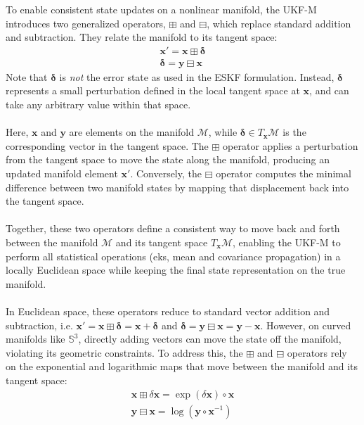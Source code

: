 \noindent
To enable consistent state updates on a nonlinear manifold, the UKF-M introduces two generalized operators, $\boxplus$ and $\boxminus$, which replace standard addition and subtraction. They relate the manifold to its tangent space:
$$
\begin{aligned}
    \mathbf{x}' = \mathbf{x} \boxplus \boldsymbol{\delta} \\
    \boldsymbol{\delta} = \mathbf{y} \boxminus \mathbf{x}
\end{aligned}
$$
Note that $\boldsymbol{\delta}$ is \textit{not} the error state as used in the ESKF formulation. Instead, $\boldsymbol{\delta}$ represents a small perturbation defined in the local tangent space at $\mathbf{x}$, and can take any arbitrary value within that space.  
\\ \\
Here, $\mathbf{x}$ and $\mathbf{y}$ are elements on the manifold $\mathcal{M}$, while $\boldsymbol{\delta} \in T_\mathbf{x}\mathcal{M}$ is the corresponding vector in the tangent space. The $\boxplus$ operator applies a perturbation from the tangent space to move the state along the manifold, producing an updated manifold element $\mathbf{x}'$. Conversely, the $\boxminus$ operator computes the minimal difference between two manifold states by mapping that displacement back into the tangent space.  
\\ \\
Together, these two operators define a consistent way to move back and forth between the manifold $\mathcal{M}$ and its tangent space $T_\mathbf{x}\mathcal{M}$, enabling the UKF-M to perform all statistical operations (eks, mean and covariance propagation) in a locally Euclidean space while keeping the final state representation on the true manifold. 
\\ \\
In Euclidean space, these operators reduce to standard vector addition and subtraction, i.e.
$\mathbf{x}' = \mathbf{x} \boxplus \boldsymbol{\delta} = \mathbf{x} + \boldsymbol{\delta}$ and $\boldsymbol{\delta} = \mathbf{y} \boxminus \mathbf{x} = \mathbf{y} - \mathbf{x}$. However, on curved manifolds like $\mathbb{S}^3$, directly adding vectors can move the state off the manifold, violating its geometric constraints. To address this, the $\boxplus$ and $\boxminus$ operators rely on the exponential and logarithmic maps that move between the manifold and its tangent space:
$$
\begin{aligned}
    \mathbf{x} \boxplus \delta\mathbf{x} = \exp(\delta\mathbf{x}) \circ \mathbf{x} \\
    \mathbf{y} \boxminus \mathbf{x} = \log(\mathbf{y} \circ \mathbf{x}^{-1})
\end{aligned}
$$
